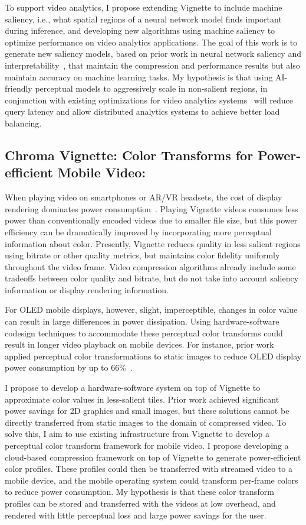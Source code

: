 To support video analytics, I propose extending Vignette to include machine saliency, i.e., what spatial regions of a neural network model finds important during inference, and developing new algorithms using machine saliency to optimize performance on video analytics applications.
The goal of this work is to generate new saliency models, based on prior work in neural network saliency and interpretability~\cite{Simonyan2013DeepIC,Zeiler2014VisualizingAU,Zintgraf2017VisualizingDN}, that maintain the compression and performance results but also maintain accuracy on machine learning tasks. 
My hypothesis is that using AI-friendly perceptual models to aggressively scale in non-salient regions, in conjunction with existing optimizations for video analytics systems~\cite{videostorm, chameleon18sigcomm, focus18osdi} will reduce query latency and allow distributed analytics systems to achieve better load balancing.

\subsection{Chroma Vignette: Color Transforms for Power-efficient Mobile Video:}
\label{sec:chroma-vign}
When playing video on smartphones or AR/VR headsets, the cost of display rendering dominates power consumption~\cite{likamwa-apsys}. 
Playing Vignette videos consumes less power than conventionally encoded videos due to smaller file size, but this power efficiency can be dramatically improved by incorporating more perceptual information about color. 
Presently, Vignette reduces quality in less salient regions using bitrate or other quality metrics, but maintains color fidelity uniformly throughout the video frame. 
Video compression algorithms already include some tradeoffs between color quality and bitrate, but do not take into account saliency information or display rendering information.

For OLED mobile displays, however, slight, imperceptible, changes in color value can result in large differences in power dissipation. 
Using hardware-software codesign techniques to accommodate these perceptual color transforms could result in longer video playback on mobile devices.
For instance, prior work applied perceptual color transformations to static images to reduce OLED display power consumption by up to 66\%~\cite{crayon, stanley2018perceived}. 

I propose to develop a hardware-software system on top of Vignette to approximate color values in less-salient tiles. 
Prior work achieved significant power savings for 2D graphics and small images, but these solutions cannot be directly transferred from static images to the domain of compressed video.
To solve this, I aim to use existing infrastructure from Vignette to develop a perceptual color transform framework for mobile video.
I propose developing a cloud-based compression framework on top of Vignette to generate power-efficient color profiles.
These profiles could then be transferred with streamed video to a mobile device, and the mobile operating system could transform per-frame colors to reduce power consumption.
My hypothesis is that these color transform profiles can be stored and transferred with the videos at low overhead, and rendered with little perceptual loss and large power savings for the user.